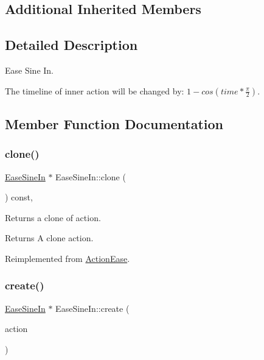 \subsection*{Additional Inherited Members}


\subsection{Detailed Description}
Ease Sine In. 

The timeline of inner action will be changed by\+: $1-cos(time*\frac { \pi }{ 2 } )$. 

\subsection{Member Function Documentation}
\mbox{\label{classEaseSineIn_a140c6fd97ab8a7d381fe5eebca3c4719}} 
\subsubsection{\texorpdfstring{clone()}{clone()}}
{\footnotesize\ttfamily \hyperlink{classEaseSineIn}{Ease\+Sine\+In} $\ast$ Ease\+Sine\+In\+::clone (\begin{DoxyParamCaption}\item[{void}]{ }\end{DoxyParamCaption}) const\hspace{0.3cm}{\ttfamily [override]}, {\ttfamily [virtual]}}

Returns a clone of action.

\begin{DoxyReturn}{Returns}
A clone action. 
\end{DoxyReturn}


Reimplemented from \hyperlink{classActionEase_a39bec93fe161fb732a74d8e51a2fe08b}{Action\+Ease}.

\mbox{\label{classEaseSineIn_a7598abdd5ad4b83e9e67e0ff18401ddc}} 
\subsubsection{\texorpdfstring{create()}{create()}}
{\footnotesize\ttfamily \hyperlink{classEaseSineIn}{Ease\+Sine\+In} $\ast$ Ease\+Sine\+In\+::create (\begin{DoxyParamCaption}\item[{\hyperlink{classActionInterval}{Action\+Interval} $\ast$}]{action }\end{DoxyParamCaption})\hspace{0.3cm}{\ttfamily [static]}}



